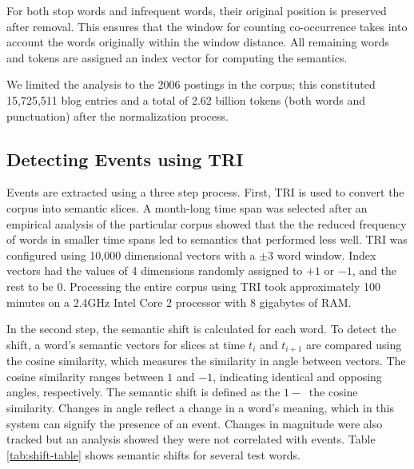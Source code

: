\documentclass[a4paper,twocolumn,twoside,10pt]{ranlp}
\begin{document}
For both stop words and infrequent words, their original position is preserved
after removal.  This ensures that the window for counting co-occurrence takes
into account the words originally within the window distance.  All remaining
words and tokens are assigned an index vector for computing the semantics.

We limited the analysis to the 2006 postings in the corpus; this constituted
15,725,511 blog entries and a total of 2.62 billion tokens (both words and
punctuation) after the normalization process.  

\subsection{Detecting Events using TRI}

Events are extracted using a three step process.  First, TRI is used to convert
the corpus into semantic slices.  A month-long time span was selected after an
empirical analysis of the particular corpus showed that the the reduced
frequency of words in smaller time spans led to semantics that performed less
well.  TRI was configured using 10,000 dimensional vectors with a $\pm 3$ word
window.  Index vectors had the values of 4 dimensions randomly assigned to $+1$
or $-1$, and the rest to be $0$.  Processing the entire corpus using TRI took
approximately 100 minutes on a 2.4GHz Intel Core 2 processor with 8 gigabytes of
RAM.

In the second step, the semantic shift is calculated for each word.  To detect
the shift, a word's semantic vectors for slices at time $t_i$ and $t_{i+1}$ are
compared using the cosine similarity, which measures the similarity in angle
between vectors.  The cosine similarity ranges between $1$ and $-1$, indicating
identical and opposing angles, respectively.  The semantic shift is defined as
the $1 -\ $ the cosine similarity.
Changes in angle reflect a change in a word's meaning, which in this system can
signify the presence of an event.  Changes in magnitude were also tracked but an
analysis showed they were not correlated with events.  Table
\ref{tab:shift-table} shows semantic shifts for several test words.
\end{document}
